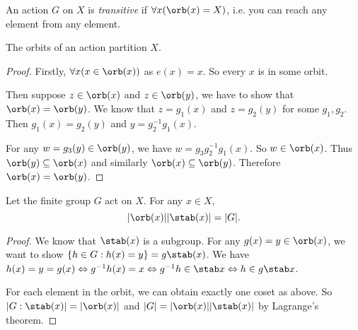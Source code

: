 \documentclass[a4paper]{article}
\begin{document}
  \begin{defi}
    An action $G$ on $X$ is \emph{transitive} if $\forall x(\orb(x) = X)$, i.e. you can reach any element from any element.
  \end{defi}

  \begin{lemma}
    The orbits of an action partition $X$.
  \end{lemma}

  \begin{proof}
    Firstly, $\forall x(x\in \orb (x))$ as $e(x) = x$. So every $x$ is in some orbit.

    Then suppose $z\in \orb (x)$ and $z\in \orb (y)$, we have to show that $\orb(x) = \orb (y)$. We know that $z = g_1(x)$ and $z = g_2(y)$ for some $g_1, g_2$. Then $g_1(x) = g_2(y)$ and $y = g_2^{-1}g_1(x)$.

    For any $w = g_3(y)\in \orb (y)$, we have $w = g_3g_2^{-1}g_1(x)$. So $w\in \orb (x)$. Thus $\orb (y) \subseteq \orb (x)$ and similarly $\orb (x) \subseteq \orb (y)$. Therefore $\orb (x) = \orb (y)$.
  \end{proof}

  \begin{thm}
    Let the finite group $G$ act on $X$. For any $x\in X$,
    \[
      |\orb(x)||\stab(x)| = |G|.
    \]
  \end{thm}

  \begin{proof}
    We know that $\stab(x)$ is a subgroup. For any $g(x) = y\in \orb(x)$, we want to show $\{h\in G: h(x) = y\} = g\stab (x)$. We have $h(x) = y = g(x) \Leftrightarrow g^{-1}h(x) = x \Leftrightarrow g^{-1}h\in \stab x \Leftrightarrow h\in g\stab x$.

    For each element in the orbit, we can obtain exactly one coset as above. So $|G: \stab (x)| = |\orb (x)|$ and $|G| = |\orb (x)||\stab(x)|$ by Lagrange's theorem.
  \end{proof}
\end{document}
